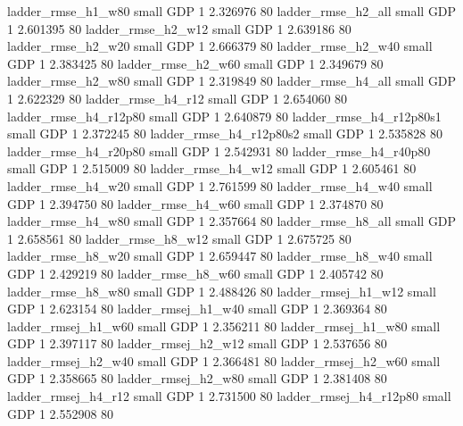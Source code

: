       ladder_rmse_h1_w80      small      GDP                 1 2.326976 80
      ladder_rmse_h2_all      small      GDP                 1 2.601395 80
      ladder_rmse_h2_w12      small      GDP                 1 2.639186 80
      ladder_rmse_h2_w20      small      GDP                 1 2.666379 80
      ladder_rmse_h2_w40      small      GDP                 1 2.383425 80
      ladder_rmse_h2_w60      small      GDP                 1 2.349679 80
      ladder_rmse_h2_w80      small      GDP                 1 2.319849 80
      ladder_rmse_h4_all      small      GDP                 1 2.622329 80
      ladder_rmse_h4_r12      small      GDP                 1 2.654060 80
   ladder_rmse_h4_r12p80      small      GDP                 1 2.640879 80
 ladder_rmse_h4_r12p80s1      small      GDP                 1 2.372245 80
 ladder_rmse_h4_r12p80s2      small      GDP                 1 2.535828 80
   ladder_rmse_h4_r20p80      small      GDP                 1 2.542931 80
   ladder_rmse_h4_r40p80      small      GDP                 1 2.515009 80
      ladder_rmse_h4_w12      small      GDP                 1 2.605461 80
      ladder_rmse_h4_w20      small      GDP                 1 2.761599 80
      ladder_rmse_h4_w40      small      GDP                 1 2.394750 80
      ladder_rmse_h4_w60      small      GDP                 1 2.374870 80
      ladder_rmse_h4_w80      small      GDP                 1 2.357664 80
      ladder_rmse_h8_all      small      GDP                 1 2.658561 80
      ladder_rmse_h8_w12      small      GDP                 1 2.675725 80
      ladder_rmse_h8_w20      small      GDP                 1 2.659447 80
      ladder_rmse_h8_w40      small      GDP                 1 2.429219 80
      ladder_rmse_h8_w60      small      GDP                 1 2.405742 80
      ladder_rmse_h8_w80      small      GDP                 1 2.488426 80
     ladder_rmsej_h1_w12      small      GDP                 1 2.623154 80
     ladder_rmsej_h1_w40      small      GDP                 1 2.369364 80
     ladder_rmsej_h1_w60      small      GDP                 1 2.356211 80
     ladder_rmsej_h1_w80      small      GDP                 1 2.397117 80
     ladder_rmsej_h2_w12      small      GDP                 1 2.537656 80
     ladder_rmsej_h2_w40      small      GDP                 1 2.366481 80
     ladder_rmsej_h2_w60      small      GDP                 1 2.358665 80
     ladder_rmsej_h2_w80      small      GDP                 1 2.381408 80
     ladder_rmsej_h4_r12      small      GDP                 1 2.731500 80
  ladder_rmsej_h4_r12p80      small      GDP                 1 2.552908 80
